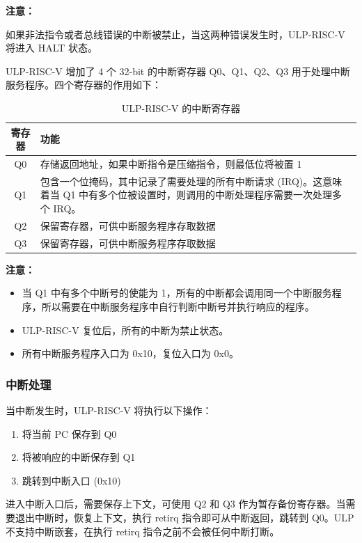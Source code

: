 \documentclass[main\_\_CN.tex]{subfiles}
\begin{document}
\textbf{注意：}

如果非法指令或者总线错误的中断被禁止，当这两种错误发生时，ULP-RISC-V 将进入 HALT 状态。

ULP-RISC-V 增加了 4 个 32-bit 的中断寄存器 Q0、Q1、Q2、Q3 用于处理中断服务程序。四个寄存器的作用如下：
\begin{table}[H]
    \centering
    \begin{tabular}{ c p{9.0cm} }
    \textbf{寄存器} & \textbf{功能} \\ \hline
    Q0 &  存储返回地址，如果中断指令是压缩指令，则最低位将被置 1\\
    Q1 &  包含一个位掩码，其中记录了需要处理的所有中断请求 (IRQ)。这意味着当 Q1 中有多个位被设置时，则调用的中断处理程序需要一次处理多个 IRQ。\\
    Q2 &  保留寄存器，可供中断服务程序存取数据\\
    Q3 &  保留寄存器，可供中断服务程序存取数据\\
    \end{tabular}
    \caption{ULP-RISC-V 的中断寄存器}
    \label{tab:PicoRV32-interrupt-registers}
\end{table}


\clearpage
\textbf{注意：}
\begin{itemize}
    \item 当 Q1 中有多个中断号的使能为 1，所有的中断都会调用同一个中断服务程序，所以需要在中断服务程序中自行判断中断号并执行响应的程序。
    \item ULP-RISC-V 复位后，所有的中断为禁止状态。
    \item 所有中断服务程序入口为 0x{}10，复位入口为 0x{}0。
\end{itemize}


\subsubsection{中断处理}

当中断发生时，ULP-RISC-V 将执行以下操作：

\begin{enumerate}
    \item 将当前 PC 保存到 Q0
    \item 将被响应的中断保存到 Q1
    \item 跳转到中断入口 (0x{}10)
\end{enumerate}

进入中断入口后，需要保存上下文，可使用 Q2 和 Q3 作为暂存备份寄存器。当需要退出中断时，恢复上下文，执行 retirq 指令即可从中断返回，跳转到 Q0。ULP 不支持中断嵌套，在执行 retirq 指令之前不会被任何中断打断。
\end{document}
